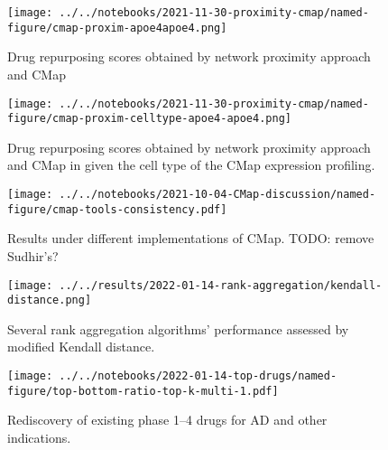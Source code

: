 \documentclass[letterpaper]{article}
\begin{document}
\begin{figure}[p]
\texttt{[image: ../../notebooks/2021-11-30-proximity-cmap/named-figure/cmap-proxim-apoe4apoe4.png]}
\caption{
Drug repurposing scores obtained by network proximity approach and CMap
}
\label{fig:proxim-cmap}
\end{figure}

\begin{figure}[p]
\texttt{[image: ../../notebooks/2021-11-30-proximity-cmap/named-figure/cmap-proxim-celltype-apoe4-apoe4.png]}
\caption{
Drug repurposing scores obtained by network proximity approach and CMap in
given the cell type of the CMap expression profiling.
}
\label{fig:proxim-cmap-celltype}
\end{figure}

\begin{figure}[p]
\texttt{[image: ../../notebooks/2021-10-04-CMap-discussion/named-figure/cmap-tools-consistency.pdf]}
\caption{
Results under different implementations of CMap.
TODO: remove Sudhir's?
}
\label{fig:cmap-cmap}
\end{figure}

\begin{figure}[p]
\texttt{[image: ../../results/2022-01-14-rank-aggregation/kendall-distance.png]}
\caption{
Several rank aggregation algorithms' performance assessed by modified Kendall
distance.
}
\label{fig:kendall-dist}
\end{figure}

\begin{figure}[p]
\texttt{[image: ../../notebooks/2022-01-14-top-drugs/named-figure/top-bottom-ratio-top-k-multi-1.pdf]}
\caption{
Rediscovery of existing phase 1--4 drugs for AD and other indications.
}
\label{fig:ad-drug-rediscovery-multi}
\end{figure}
\end{document}
